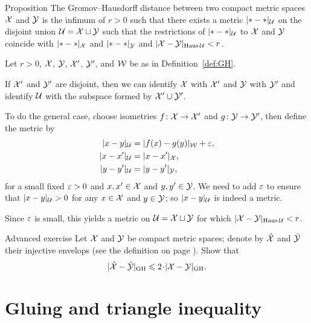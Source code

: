 \begin{thm}{Proposition}\label{prop:GH=X+Y}
The Gromov--Hausdorff distance between two compact metric spaces $\mathcal{X}$
and $\mathcal{Y}$ is the infimum of $r > 0$ such that there exists a metric
$|{*}-{*}|_{\mathcal{U}}$ on the disjoint union $\mathcal{U}=\mathcal{X}\sqcup \mathcal{Y}$ 
such that the restrictions of $|{*}-{*}|_{\mathcal{U}}$ to $\mathcal{X}$ and $\mathcal{Y}$
coincide with $|{*}-{*}|_{\mathcal{X}}$ and $|{*}-{*}|_{\mathcal{Y}}$ 
and $|\mathcal{X}-\mathcal{Y}|_{\operatorname{\rm Haus}\nolimits\mathcal{U}} < r$. 
\end{thm}

Let $r>0$, $\mathcal{X}$, $\mathcal{Y}$, $\mathcal{X}'$, $\mathcal{Y}'$, and $\mathcal{W}$ be as in Definition~\ref{def:GH}.

If  $\mathcal{X}'$ and $\mathcal{Y}'$ are disjoint, then we can identify $\mathcal{X}$ with  $\mathcal{X}'$ and $\mathcal{Y}$ with $\mathcal{Y}'$ and identify $\mathcal{U}$ with the subspace formed by $\mathcal{X}'\cup\mathcal{Y}'$.

To do the general case,
choose isometries $f\colon \mathcal{X} \to \mathcal{X}'$ and
$g\: \spc{Y} \z\to \spc{Y}'$, then define the metric by
\begin{align*}
|x-y|_{\spc{U}} &= |f (x)\z- g(y)|_{\spc{W}}+\eps,
\\
|x-x'|_{\spc{U}} &= |x- x'|_{\spc{X}},
\\
|y-y'|_{\spc{U}} &= |y- y'|_{\spc{Y}},
\end{align*}
for a small fixed $\varepsilon>0$ and $x,x' \in \mathcal{X}$ and $y,y' \in \mathcal{Y}$.
We need to add $\varepsilon$ to ensure that $|x-y|_{\mathcal{U}} > 0$ for any $x\in \mathcal{X}$ and $y\in \mathcal{Y}$;
so $|x-y|_{\mathcal{U}}$ is indeed a metric.

Since $\varepsilon$ is small,
this yields a metric on $\mathcal{U}=\mathcal{X}\sqcup \mathcal{Y}$ for which
$|\spc{X}- \spc{Y}|_{\Haus\spc{U}} \z< r$.
\qeds

\begin{thm}{Advanced exercise}\label{ex:GH-inj}
Let $\mathcal{X}$ and $\mathcal{Y}$ be compact metric spaces;
denote by $\hat{\mathcal{X}}$ and $\hat{\mathcal{Y}}$ their injective envelops (see the definition on page \pageref{page:InjX}).
Show that 
\[|\hat{\spc{X}}-\hat{\spc{Y}}|_{\GH}\le 2\cdot|\spc{X}- \spc{Y}|_{\GH}.\] 

\end{thm}

\section{Gluing and triangle inequality}\label{sec:gluing+triangle}

